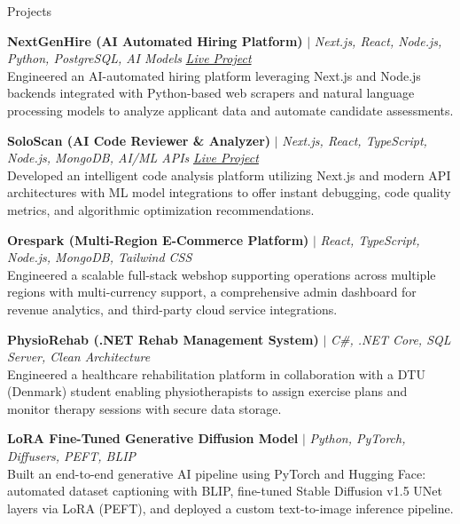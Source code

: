 \documentclass{resume} %
\begin{document}

\begin{rSection}{Projects}
\vspace{-1.25em}

\item \textbf{NextGenHire (AI Automated Hiring Platform)} $|$ \textit{Next.js, React, Node.js, Python, PostgreSQL, AI Models} \hfill \textit{\href{https://nextgennhire.vercel.app/}{Live Project}}\\
{Engineered an AI-automated hiring platform leveraging Next.js and Node.js backends integrated with Python-based web scrapers and natural language processing models to analyze applicant data and automate candidate assessments.}

\item \textbf{SoloScan (AI Code Reviewer \& Analyzer)} $|$ \textit{Next.js, React, TypeScript, Node.js, MongoDB, AI/ML APIs} \hfill \textit{\href{https://soloscan.vercel.app/}{Live Project}}\\
{Developed an intelligent code analysis platform utilizing Next.js and modern API architectures with ML model integrations to offer instant debugging, code quality metrics, and algorithmic optimization recommendations.}

\item \textbf{Orespark (Multi-Region E-Commerce Platform)} $|$ \textit{React, TypeScript, Node.js, MongoDB, Tailwind CSS} \hfill \textit{}\\
{Engineered a scalable full-stack webshop supporting operations across multiple regions with multi-currency support, a comprehensive admin dashboard for revenue analytics, and third-party cloud service integrations.}

\item \textbf{PhysioRehab (.NET Rehab Management System)} $|$ \textit{C\#, .NET Core, SQL Server, Clean Architecture} \hfill \textit{}\\
{Engineered a healthcare rehabilitation platform in collaboration with a DTU (Denmark) student enabling physiotherapists to assign exercise plans and monitor therapy sessions with secure data storage.}

\item \textbf{LoRA Fine-Tuned Generative Diffusion Model} $|$ \textit{Python, PyTorch, Diffusers, PEFT, BLIP} \hfill \textit{}\\
{Built an end-to-end generative AI pipeline using PyTorch and Hugging Face: automated dataset captioning with BLIP, fine-tuned Stable Diffusion v1.5 UNet layers via LoRA (PEFT), and deployed a custom text-to-image inference pipeline.}

\end{rSection}
\end{document}
